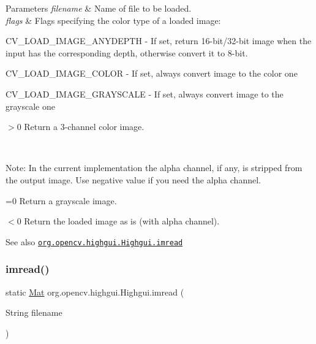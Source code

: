 \begin{DoxyParams}{Parameters}
{\em filename} & Name of file to be loaded. \\
\hline
{\em flags} & Flags specifying the color type of a loaded image\+: 
\begin{DoxyItemize}
\item C\+V\+\_\+\+L\+O\+A\+D\+\_\+\+I\+M\+A\+G\+E\+\_\+\+A\+N\+Y\+D\+E\+P\+TH -\/ If set, return 16-\/bit/32-\/bit image when the input has the corresponding depth, otherwise convert it to 8-\/bit. 
\item C\+V\+\_\+\+L\+O\+A\+D\+\_\+\+I\+M\+A\+G\+E\+\_\+\+C\+O\+L\+OR -\/ If set, always convert image to the color one 
\item C\+V\+\_\+\+L\+O\+A\+D\+\_\+\+I\+M\+A\+G\+E\+\_\+\+G\+R\+A\+Y\+S\+C\+A\+LE -\/ If set, always convert image to the grayscale one 
\item $>$0 Return a 3-\/channel color image. 
\end{DoxyItemize}\\
\hline
\end{DoxyParams}
Note\+: In the current implementation the alpha channel, if any, is stripped from the output image. Use negative value if you need the alpha channel.


\begin{DoxyItemize}
\item =0 Return a grayscale image. 
\item $<$0 Return the loaded image as is (with alpha channel). 
\end{DoxyItemize}

\begin{DoxySeeAlso}{See also}
\href{http://docs.opencv.org/modules/highgui/doc/reading_and_writing_images_and_video.html#imread}{\tt org.\+opencv.\+highgui.\+Highgui.\+imread} 
\end{DoxySeeAlso}
\mbox{\label{classorg_1_1opencv_1_1highgui_1_1_highgui_a5a6663aa4361aeee0ac48902d46a15f6}} 
\subsubsection{\texorpdfstring{imread()}{imread()}\hspace{0.1cm}{\footnotesize\ttfamily [2/2]}}
{\footnotesize\ttfamily static \mbox{\hyperlink{classorg_1_1opencv_1_1core_1_1_mat}{Mat}} org.\+opencv.\+highgui.\+Highgui.\+imread (\begin{DoxyParamCaption}\item[{String}]{filename }\end{DoxyParamCaption})\hspace{0.3cm}{\ttfamily [static]}}

